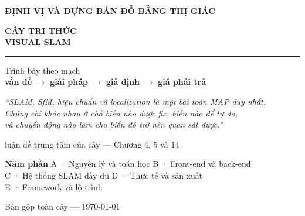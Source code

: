 \documentclass[11pt,a4paper,oneside]{report}
\begin{document}
\begin{titlepage}
\thispagestyle{empty}

\vspace*{4.2cm}
\begin{flushleft}
{\sffamily\bfseries\color{accent}\large ĐỊNH VỊ VÀ DỰNG BẢN ĐỒ BẰNG THỊ GIÁC\par}
\vspace{0.5cm}
{\sffamily\bfseries\color{inkblue}\fontsize{40}{45}\selectfont
CÂY TRI THỨC\\[0.12em] VISUAL SLAM\par}
\vspace{0.9cm}
{\color{accent}\rule{7cm}{2.4pt}}\par
\vspace{0.9cm}
{\large\color{inkblue!85}
Trình bày theo mạch\\[0.25em]
\textbf{vấn đề} \(\rightarrow\) \textbf{giải pháp} \(\rightarrow\) \textbf{giả định} \(\rightarrow\) \textbf{giá phải trả}\par}
\end{flushleft}

\vfill
\begin{flushleft}
{\itshape\color{tiercol}``SLAM, SfM, hiệu chuẩn và localization là một bài toán MAP duy nhất.\\
Chúng chỉ khác nhau ở chỗ biến nào được fix, biến nào để tự do,\\
và chuyển động nào làm cho biến đó trở nên quan sát được.''\par}
{\footnotesize\sffamily\color{tiercol}luận đề trung tâm của cây --- Chương 4, 5 và 14\par}
\vspace{1.1cm}
{\footnotesize\sffamily\color{inkblue}\textbf{Năm phần}\quad
A · Nguyên lý và toán học \quad B · Front-end và back-end\\[0.25em]
\quad C · Hệ thống SLAM đầy đủ \quad D · Thực tế và sản xuất\\[0.25em]
\quad E · Framework và lộ trình\par}
\vspace{0.5em}
{\footnotesize\sffamily\color{tiercol}Bản gộp toàn cây --- \today\par}
\end{flushleft}
\end{titlepage}
\end{document}
